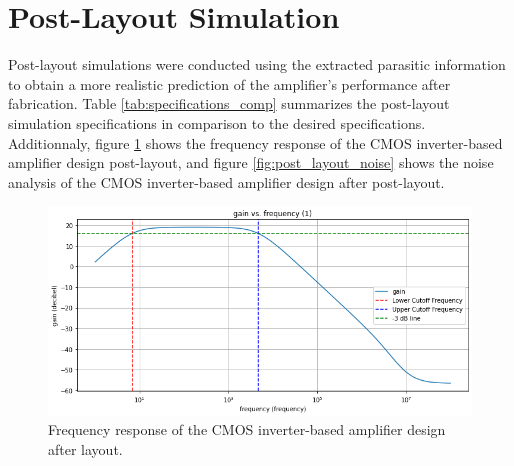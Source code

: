 \section{Post-Layout Simulation}
Post-layout simulations were conducted using the extracted parasitic information to obtain a more realistic prediction of the amplifier's performance after fabrication. 
Table \ref{tab:specifications_comp} summarizes the post-layout simulation specifications in comparison to the desired specifications.
\\
Additionnaly, figure \ref{fig:post_layout_frequency_response} shows the frequency response of the CMOS inverter-based amplifier design post-layout, 
and figure \ref{fig:post_layout_noise} shows the noise analysis of the CMOS inverter-based amplifier design after post-layout.

\begin{table}[ht!]
    \centering
    \caption{Specification Comparison}
    \label{tab:specifications_comp}
\end{table}

\begin{figure}[ht!]
    \centering
    \includegraphics[width=\textwidth]{Figures/post_layout_frequency_response.png}
    \caption{Frequency response of the CMOS inverter-based amplifier design after layout.}
    \label{fig:post_layout_frequency_response}
\end{figure}


